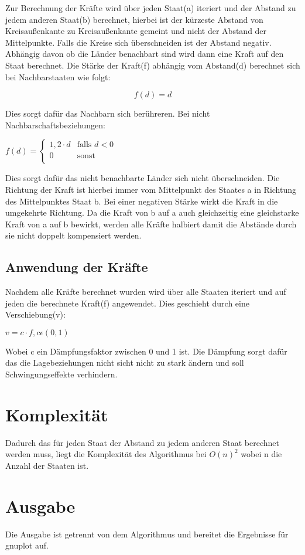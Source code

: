 Zur Berechnung der Kräfte wird über jeden Staat(a) iteriert und der Abstand zu jedem anderen Staat(b) berechnet,
hierbei ist der kürzeste Abstand von Kreisaußenkante zu Kreisaußenkante gemeint und nicht der Abstand der Mittelpunkte.
Falls die Kreise sich überschneiden ist der Abstand negativ.
Abhängig davon ob die Länder benachbart sind wird dann eine Kraft auf den Staat berechnet.
Die Stärke der Kraft(f) abhängig vom Abstand(d) berechnet sich bei Nachbarstaaten wie folgt:
\begin{center}
    $$ f(d) = d $$
\end{center}
Dies sorgt dafür das Nachbarn sich berühreren.
Bei nicht Nachbarschaftsbeziehungen:
\begin{center}
    $
    f(d) = \left\{
        \begin{array}{ll}
            1,2 \cdot d & \textrm{falls }d < 0 \\
            0 & \textrm{sonst} \\
        \end{array} \right.
    $
\end{center}
Dies sorgt dafür das nicht benachbarte Länder sich nicht überschneiden.
Die Richtung der Kraft ist hierbei immer vom Mittelpunkt des Staates a in Richtung des Mittelpunktes Staat b.
Bei einer negativen Stärke wirkt die Kraft in die umgekehrte Richtung.
Da die Kraft von b auf a auch gleichzeitig eine gleichstarke Kraft von a auf b bewirkt,
werden alle Kräfte halbiert damit die Abstände durch sie nicht doppelt kompensiert werden.

\subsection{Anwendung der Kräfte}

Nachdem alle Kräfte berechnet wurden wird über alle Staaten iteriert und auf jeden die berechnete Kraft(f) angewendet.
Dies geschieht durch eine Verschiebung(v):

\begin{center}
    $ v = c \cdot f , c \epsilon (0,1) $
\end{center}

Wobei c ein Dämpfungsfaktor zwischen 0 und 1 ist.
Die Dämpfung sorgt dafür das die Lagebeziehungen nicht sicht nicht zu stark ändern und soll Schwingungseffekte verhindern.

\section{Komplexität}

Dadurch das für jeden Staat der Abstand zu jedem anderen Staat berechnet werden muss, liegt die Komplexität des Algorithmus bei $O(n)^2$ wobei n die Anzahl der Staaten ist.

\section{Ausgabe}

Die Ausgabe ist getrennt von dem Algorithmus und bereitet die Ergebnisse für gnuplot auf.
